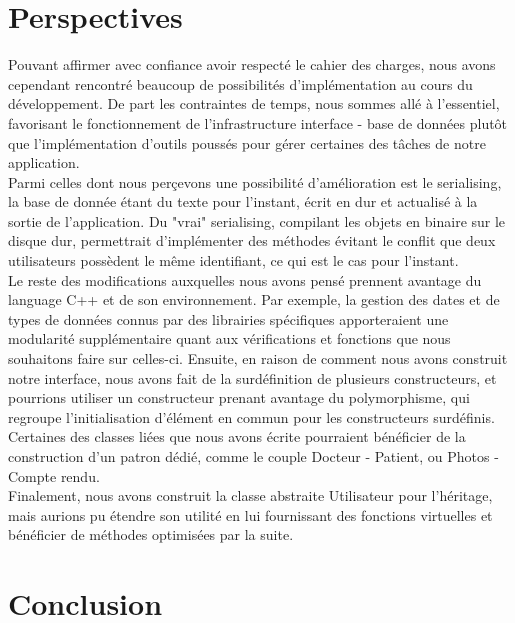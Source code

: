 \documentclass[12pt,a4paper]{article}
\begin{document}
	\begin{multicols}{2}
				
		\section{Perspectives}
		
		Pouvant affirmer avec confiance avoir respecté le cahier des charges, nous avons cependant rencontré beaucoup de possibilités d'implémentation au cours du développement. De part les contraintes de temps, nous sommes allé à l'essentiel, favorisant le fonctionnement de l'infrastructure interface - base de données plutôt que l'implémentation d'outils poussés pour gérer certaines des tâches de notre application. \\
		
		Parmi celles dont nous perçevons une possibilité d'amélioration est le serialising, la base de donnée étant du texte pour l'instant, écrit en dur et actualisé à la sortie de l'application. Du "vrai" serialising, compilant les objets en binaire sur le disque dur, permettrait d'implémenter des méthodes évitant le conflit que deux utilisateurs possèdent le même identifiant, ce qui est le cas pour l'instant. \\
		
		Le reste des modifications auxquelles nous avons pensé prennent avantage du language C++ et de son environnement. Par exemple, la gestion des dates et de types de données connus par des librairies spécifiques apporteraient une modularité supplémentaire quant aux vérifications et fonctions que nous souhaitons faire sur celles-ci. Ensuite, en raison de comment nous avons construit notre interface, nous avons fait de la surdéfinition de plusieurs constructeurs, et pourrions utiliser un constructeur prenant avantage du polymorphisme, qui regroupe l'initialisation d'élément en commun pour les constructeurs surdéfinis. Certaines des classes liées que nous avons écrite pourraient bénéficier de la construction d'un patron dédié, comme le couple Docteur - Patient, ou Photos - Compte rendu. \\
		
		Finalement, nous avons construit la classe abstraite Utilisateur pour l'héritage, mais aurions pu étendre son utilité en lui fournissant des fonctions virtuelles et bénéficier de méthodes optimisées par la suite. \\
		
		\section{Conclusion}
		

\end{multicols}
\end{document}
